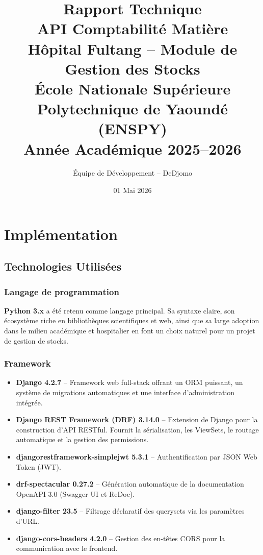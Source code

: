 \documentclass[12pt,a4paper]{report}
\title{
    \vspace{-2cm}
    \textbf{\Huge Rapport Technique}\\[0.5cm]
    \textbf{\LARGE API Comptabilité Matière}\\[0.3cm]
    \large Hôpital Fultang -- Module de Gestion des Stocks\\[1cm]
    \large École Nationale Supérieure Polytechnique de Yaoundé (ENSPY)\\
    \large Année Académique 2025--2026
}
\author{Équipe de Développement -- DeDjomo}
\date{01 Mai 2026}
\begin{document}
\maketitle
\tableofcontents
\newpage

\part{Implémentation}

\chapter{Technologies Utilisées}

\section{Langage de programmation}
\textbf{Python 3.x} a été retenu comme langage principal. Sa syntaxe claire, son écosystème riche en bibliothèques scientifiques et web, ainsi que sa large adoption dans le milieu académique et hospitalier en font un choix naturel pour un projet de gestion de stocks.

\section{Framework}
\begin{itemize}[leftmargin=*]
    \item \textbf{Django 4.2.7} -- Framework web full-stack offrant un ORM puissant, un système de migrations automatiques et une interface d'administration intégrée.
    \item \textbf{Django REST Framework (DRF) 3.14.0} -- Extension de Django pour la construction d'API RESTful. Fournit la sérialisation, les ViewSets, le routage automatique et la gestion des permissions.
    \item \textbf{djangorestframework-simplejwt 5.3.1} -- Authentification par JSON Web Token (JWT).
    \item \textbf{drf-spectacular 0.27.2} -- Génération automatique de la documentation OpenAPI 3.0 (Swagger UI et ReDoc).
    \item \textbf{django-filter 23.5} -- Filtrage déclaratif des querysets via les paramètres d'URL.
    \item \textbf{django-cors-headers 4.2.0} -- Gestion des en-têtes CORS pour la communication avec le frontend.
\end{itemize}
\end{document}
